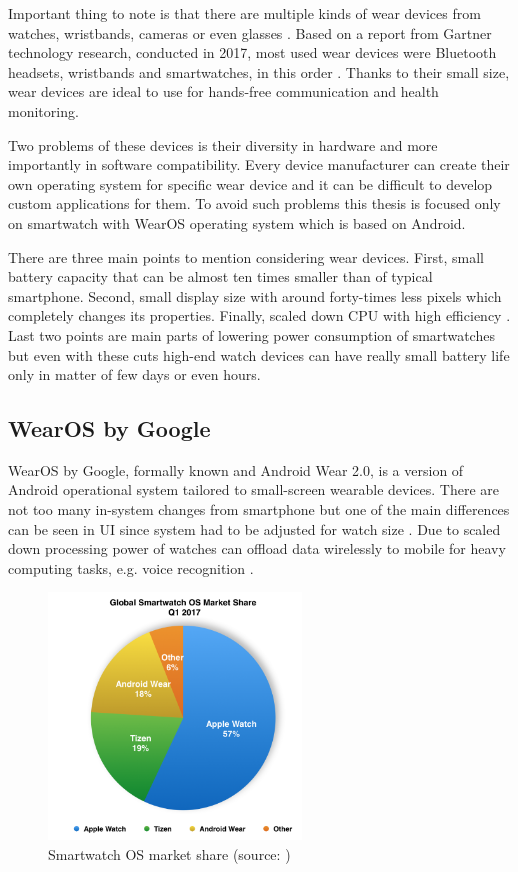 Important thing to note is that there are multiple kinds of wear devices from watches, wristbands, cameras or even glasses \cite{MIWD}. Based on a report from Gartner technology research, conducted in 2017, most used wear devices were Bluetooth headsets, wristbands and smartwatches, in this order \cite{GSWWDS}. Thanks to their small size, wear devices are ideal to use for hands-free communication and health monitoring.

Two problems of these devices is their diversity in hardware and more importantly in software compatibility. Every device manufacturer can create their own operating system for specific wear device and it can be difficult to develop custom applications for them. To avoid such problems this thesis is focused only on smartwatch with WearOS operating system which is based on Android. 

There are three main points to mention considering wear devices. First, small battery capacity that can be almost ten times smaller than of typical smartphone. Second, small display size with around forty-times less pixels which completely changes its properties. Finally, scaled down CPU with high efficiency \cite{UtCoAWO}. Last two points are main parts of lowering power consumption of smartwatches but even with these cuts high-end watch devices can have really small battery life only in matter of few days or even hours.

\subsection{WearOS by Google}\label{sec:WearOS}
WearOS by Google, formally known and Android Wear 2.0, is a version of Android operational system tailored to small-screen wearable devices. There are not too many in-system changes from smartphone but one of the main differences can be seen in UI since system had to be adjusted for watch size \cite{CSUITW}. Due to scaled down processing power of watches can offload data wirelessly to mobile for heavy computing tasks, e.g. voice recognition \cite{UCAW}.

\begin{figure}[H]
	\begin{centering}
		\includegraphics[width=0.6\textwidth]{img/wear_market_share}
		\par\end{centering}
	\caption{Smartwatch OS market share (source: \cite{TOAW})\label{fig:SmartwatchOSMarketShare}}
	\label{fig02c04}
\end{figure}

